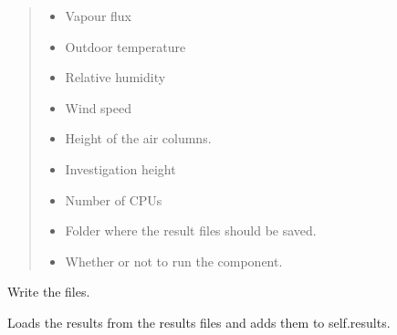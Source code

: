 \documentclass[letterpaper,10pt,english]{sphinxmanual}
\begin{document}
\begin{fulllineitems}
\begin{fulllineitems}
\begin{quote}
\begin{description}
\begin{itemize}
\item {} 
 \textendash{} Vapour flux

\item {} 
 \textendash{} Outdoor temperature

\item {} 
 \textendash{} Relative humidity

\item {} 
 \textendash{} Wind speed

\item {} 
 \textendash{} Height of the air columns.

\item {} 
 \textendash{} Investigation height

\item {} 
 \textendash{} Number of CPUs

\item {} 
 \textendash{} Folder where the result files should be saved.

\item {} 
 \textendash{} Whether or not to run the component.

\end{itemize}

\end{description}\end{quote}

\end{fulllineitems}


\begin{fulllineitems}
\label{\detokenize{comfort:livestock.components.air.NewAirConditions.write_files}}
Write the files.

\end{fulllineitems}


\end{fulllineitems}


\begin{fulllineitems}
\label{\detokenize{comfort:livestock.components.air.load_new_air_results}}
Loads the results from the results files and adds them to self.results.

\end{fulllineitems}
\end{document}
